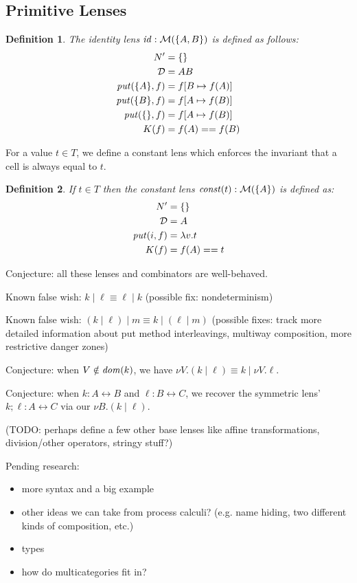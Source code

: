 \documentclass{article}
\newcommand{\lens}{\leftrightarrow}
\newtheorem{definition}{Definition}
\begin{document}
\subsection{Primitive Lenses}


\newcommand{\id}{\mathit{id}}
\begin{definition}
    The identity lens $\id : \mlens{\{A,B\}}$ is defined as follows:
    \begin{align*}
        N' &= \{\} \\
        \mathcal D &= AB \\
        \mathit{put}(\{A\},f) &= f[B \mapsto f(A)] \\
        \mathit{put}(\{B\},f) &= f[A \mapsto f(B)] \\
        \mathit{put}(\{\},f) &= f[A \mapsto f(B)] \\
        K(f) &= f(A) == f(B)
    \end{align*}
\end{definition} 

For a value $t \in T$, we define a constant lens
which enforces the invariant that a cell is always
equal to $t$.

\newcommand{\const}{\mathit{const}}
\begin{definition}
    If $t \in T$ then the constant lens
    $\const(t) : \mlens{\{A\}}$ is defined as:
    \begin{align*}
        N' &= \{\} \\
        \mathcal D &= A \\
        \mathit{put}(i,f) &= \lambda v. t \\
        K(f) &= f(A) == t
    \end{align*}
\end{definition}

Conjecture: all these lenses and combinators are well-behaved.

Known false wish: $k \mid \ell \equiv \ell \mid k$ (possible fix:
nondeterminism)

Known false wish: $(k \mid \ell) \mid m \equiv k \mid (\ell \mid m)$
(possible fixes: track more detailed information about put method
interleavings, multiway composition, more restrictive danger zones)

Conjecture: when $V \notin \mathit{dom}(k)$, we have $\nu V. (k \mid \ell) \equiv
k \mid \nu V. \ell$.

Conjecture: when $k : A \lens B$ and $\ell : B \lens C$, we recover the
symmetric lens' $k;\ell : A \lens C$ via our $\nu B.(k \mid \ell)$.

(TODO: perhaps define a few other base lenses like affine transformations,
division/other operators, stringy stuff?)

Pending research:
\begin{itemize}
    \item more syntax and a big example
    \item other ideas we can take from process calculi? (e.g. name hiding,
        two different kinds of composition, etc.)
    \item types
    \item how do multicategories fit in?
\end{itemize}
\end{document}
